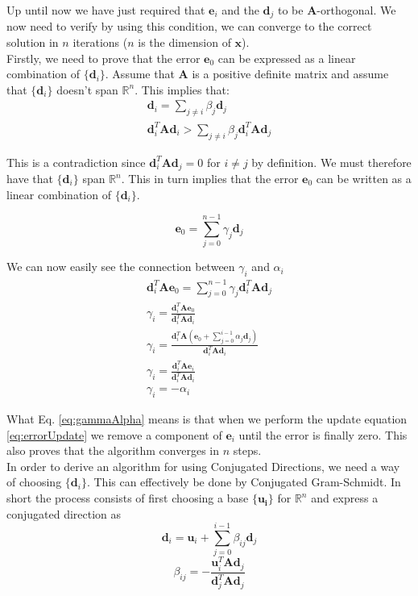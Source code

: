 \documentclass[a4paper,10pt]{article}
\theoremstyle{definition}
\begin{document}
Up until now we have just required that $\pmb{e}_{i}$ and the $\pmb{d}_j$ to be $\pmb{A}$-orthogonal. We now need to verify by using this condition, we can converge to the correct solution in $n$ iterations ($n$ is the dimension of $\pmb{x}$).\\

Firstly, we need to prove that the error $\pmb{e}_0$ can be expressed as a linear combination of $\{\pmb{d}_i\}$. Assume that $\pmb{A}$ is a positive definite matrix and assume that $\{\pmb{d}_i\}$ doesn't span $\mathbb{R}^n$. This implies that:
\begin{gather}
	\pmb{d}_i = \sum_{j\neq i} \beta_j \pmb{d}_j \\
	\pmb{d}_i^T \pmb{A} \pmb{d}_i > \sum_{j\neq i} \beta_j \pmb{d}_i^T \pmb{A} \pmb{d}_j 
\end{gather}

This is a contradiction since $\pmb{d}_i^T \pmb{A} \pmb{d}_j = 0$ for $i\neq j$ by definition. We must therefore have that $\{\pmb{d}_i\}$ span $\mathbb{R}^n$. This in turn implies that the error $\pmb{e}_0$ can be written as a linear combination of $\{\pmb{d}_i\}$.

\begin{equation}
	\pmb{e}_0 = \sum_{j=0}^{n-1}\gamma_j\pmb{d}_j
\end{equation}

We can now easily see the connection between $\gamma_i$ and $\alpha_i$
\begin{gather}
	\pmb{d}_i^T \pmb{A} \pmb{e}_0 = \sum_{j=0}^{n-1}\gamma_j\pmb{d}_i^T \pmb{A} \pmb{d}_j \\
	\gamma_i = \frac{\pmb{d}_i^T\pmb{A} \pmb{e}_{0}}{\pmb{d}_i^T\pmb{A} \pmb{d}_i}\\
	\gamma_i = \frac{\pmb{d}_i^T\pmb{A} (\pmb{e}_{0} + \sum_{j=0}^{i-1}\alpha_j \pmb{d}_j)}{\pmb{d}_i^T\pmb{A} \pmb{d}_i} \\
	\gamma_i =\frac{\pmb{d}_i^T\pmb{A} \pmb{e}_i}{\pmb{d}_i^T\pmb{A} \pmb{d}_i} \\
	\gamma_i = -\alpha_i
	\label{eq:gammaAlpha}
\end{gather}

What Eq. \ref{eq:gammaAlpha} means is that when we perform the update equation \ref{eq:errorUpdate} we remove a component of $\pmb{e}_i$ until the error is finally zero. This also proves that the algorithm converges in $n$ steps.\\

In order to derive an algorithm for using Conjugated Directions, we need a way of choosing $\{\pmb{d}_i\}$. This can effectively be done by Conjugated Gram-Schmidt. In short the process consists of first choosing a base $\{\pmb{u_i}\}$ for $\mathbb{R}^n$ and express a conjugated direction as 
\begin{equation}
	\pmb{d}_i = \pmb{u}_i + \sum_{j=0}^{i-1}\beta_{ij}\pmb{d}_j
	\label{eq:directionConstruction}
\end{equation}
\begin{equation}
	\beta_{ij} = -\frac{\pmb{u}_i^T \pmb{A} \pmb{d}_j}{\pmb{d}_j^T \pmb{A} \pmb{d}_j}
	\label{eq:betaEquation}
\end{equation}
\end{document}
